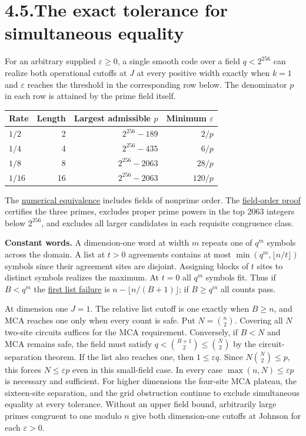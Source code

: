 \documentclass[11pt,letterpaper]{article}
\begin{document}
\section*{4.5.\quad The exact tolerance for simultaneous equality}
For an arbitrary supplied $\varepsilon\ge0$, a single smooth code over a field
$q<2^{256}$ can realize both operational cutoffs at $J$ at every positive width exactly
when $k=1$ and $\varepsilon$ reaches the threshold in the corresponding row below.
The denominator $p$ in each row is attained by the prime field itself.
\begin{center}
\begin{tabular}{@{}lrrr@{}}\toprule
Rate & Length & Largest admissible $p$ & Minimum $\varepsilon$\\\midrule
$1/2$ &2&$2^{256}-189$ &$2/p$\\
$1/4$ &4&$2^{256}-435$ &$6/p$\\
$1/8$ &8&$2^{256}-2063$ &$28/p$\\
$1/16$&16&$2^{256}-2063$ &$120/p$\\\bottomrule
\end{tabular}
\end{center}
The \href{https://github.com/SlopDotCash/proximityprize/blob/e702fdaad1f22675ce16e04e72a7dc117869930a/ArkLib/Research/ProximityGap/JointJohnsonFieldCeiling.lean}{numerical equivalence}
includes fields of nonprime order. The
\href{https://github.com/SlopDotCash/proximityprize/blob/e702fdaad1f22675ce16e04e72a7dc117869930a/ArkLib/Research/ProximityGap/Frontier/PrizeFieldCeiling.lean}{field-order proof}
certifies the three primes, excludes proper prime powers in the top 2063 integers below
$2^{256}$, and excludes all larger candidates in each requisite congruence class.

\textbf{Constant words.} A dimension-one word at width $m$ repeats one of $q^m$
symbols across the domain. A list at $t>0$ agreements contains at most
$\min(q^m,\lfloor n/t\rfloor)$ symbols since their agreement sites are disjoint.
Assigning blocks of $t$ sites to distinct symbols realizes the maximum. At $t=0$ all
$q^m$ symbols fit. Thus if $B<q^m$ the
\href{https://github.com/SlopDotCash/proximityprize/blob/fd835ba9cb574091c75835f1738f6a0dac16c21e/ArkLib/Research/ProximityGap/DimensionOneList.lean}{first list failure}
is $n-\lfloor n/(B+1)\rfloor$; if $B\ge q^m$ all counts pass.

At dimension one $J=1$. The relative list cutoff is one exactly when $B\ge n$,
and MCA reaches one only when every count is safe. Put $N=\binom n2$.
Covering all $N$ two-site circuits suffices for the MCA requirement.
Conversely, if $B<N$ and MCA remains safe, the field must satisfy
$q<\binom{B+1}{2}\le\binom N2$ by the circuit-separation theorem.
If the list also reaches one, then $1\le\varepsilon q$. Since
$N\binom N2\le p$, this forces $N\le\varepsilon p$ even in this small-field case.
In every case $\max(n,N)\le\varepsilon p$ is necessary and sufficient.
For higher dimensions the four-site MCA plateau, the sixteen-site separation, and the
grid obstruction continue to exclude simultaneous equality at every tolerance. Without
an upper field bound, arbitrarily large primes congruent to one modulo $n$ give both
dimension-one cutoffs at Johnson for each $\varepsilon>0$.
\end{document}
